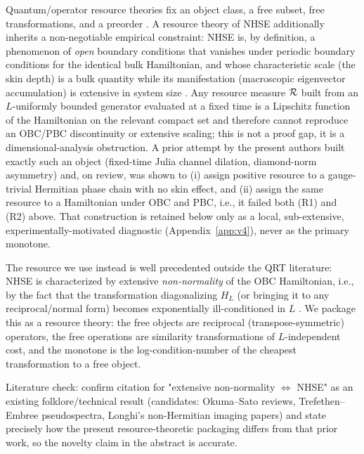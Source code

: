 Quantum/operator resource theories fix an object class, a free
subset, free transformations, and a preorder
\cite{ChitambarGour,LiuYuan,ChiribellaSupermap}. A resource theory
of NHSE additionally inherits a non-negotiable empirical constraint:
NHSE is, by definition, a phenomenon of \emph{open} boundary
conditions that vanishes under periodic boundary conditions for the
identical bulk Hamiltonian, and whose characteristic scale (the skin
depth) is a bulk quantity while its manifestation (macroscopic
eigenvector accumulation) is extensive in system size
\cite{HatanoNelson,YaoWang,OkumaEtAl2020}. Any resource measure
$\mathcal R$ built from an $L$-uniformly bounded generator evaluated at a
fixed time is a Lipschitz function of the Hamiltonian on the
relevant compact set and therefore cannot reproduce an
OBC/PBC discontinuity or extensive scaling; this is not a proof
gap, it is a dimensional-analysis obstruction. A prior attempt by
the present authors built exactly such an object (fixed-time Julia
channel dilation, diamond-norm asymmetry) and, on review, was shown
to (i) assign positive resource to a gauge-trivial Hermitian phase
chain with no skin effect, and (ii) assign the same resource to a
Hamiltonian under OBC and PBC, i.e., it failed both (R1) and (R2)
above. That construction is retained below only as a local,
sub-extensive, experimentally-motivated diagnostic
(Appendix~\ref{app:v4}), never as the primary monotone.

The resource we use instead is well precedented outside the QRT
literature: NHSE is characterized by extensive \emph{non-normality}
of the OBC Hamiltonian, i.e., by the fact that the transformation
diagonalizing $H_L$ (or bringing it to any reciprocal/normal form)
becomes exponentially ill-conditioned in $L$
\cite{OkumaEtAl2020,TrefethenEmbree}. We package this as a resource
theory: the free objects are reciprocal (transpose-symmetric)
operators, the free operations are similarity transformations of
$L$-independent cost, and the monotone is the log-condition-number
of the cheapest transformation to a free object.

\begin{todo}
Literature check: confirm citation for "extensive non-normality
$\Leftrightarrow$ NHSE" as an existing folklore/technical result
(candidates: Okuma--Sato reviews, Trefethen--Embree pseudospectra,
Longhi's non-Hermitian imaging papers) and state precisely how the
present resource-theoretic packaging differs from that prior work,
so the novelty claim in the abstract is accurate.
\end{todo}


